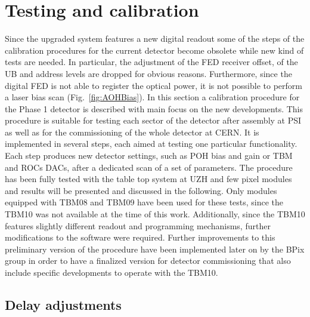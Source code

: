 \section{Testing and calibration}\label{sec:Phase1Calib}

Since the upgraded system features a new digital readout some of the steps of the calibration procedures for the current detector become obsolete while new kind of tests are needed.
In particular, the adjustment of the FED receiver offset, of the UB and address levels are dropped for obvious reasons.
Furthermore, since the digital FED is not able to register the optical power, it is not possible to perform a laser bias scan (Fig.~\ref{fig:AOHBias}).
In this section a calibration procedure for the Phase 1 detector is described with main focus on the new developments.
This procedure is suitable for testing each sector of the detector after assembly at PSI as well as for the commissioning of the whole detector at CERN.
It is implemented in several steps, each aimed at testing one particular functionality. 
Each step produces new detector settings, such as POH bias and gain or TBM and ROCs DACs, after a dedicated scan of a set of parameters.
The procedure has been fully tested with the table top system at UZH and few pixel modules and results will be presented and discussed in the following.
Only modules equipped with TBM08 and TBM09 have been used for these tests,
since the TBM10 was not available at the time of this work.
Additionally, since the TBM10 features slightly different readout and programming mechanisms, further modifications to the software were required.
Further improvements to this preliminary version of the procedure have been implemented later on by the BPix group in order to have a finalized version for detector commissioning
that also include specific developments to operate with the TBM10.

\subsection{Delay adjustments}\label{subsec:TBMPLLROCDelays}

